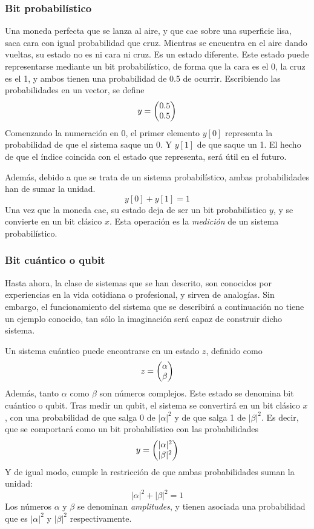 \subsubsection{Bit probabilístico}

Una moneda perfecta que se lanza al aire, y que cae sobre una superficie lisa, 
saca cara con igual probabilidad que cruz. Mientras se encuentra en el aire 
dando vueltas, su estado no es ni cara ni cruz. Es un estado diferente. Este 
estado puede representarse mediante un bit probabilístico, de forma que la cara 
es el 0, la cruz es el 1, y ambos tienen una probabilidad de 0.5 de ocurrir.  
Escribiendo las probabilidades en un vector, se define
%
$$ y = \begin{pmatrix} 0.5 \\ 0.5 \end{pmatrix} $$
%
Comenzando la numeración en 0, el primer elemento $y[0]$ representa la 
probabilidad de que el sistema saque un 0. Y $y[1]$ de que saque un 1. El hecho 
de que el índice coincida con el estado que representa, será útil en el futuro.

Además, debido a que se trata de un sistema probabilístico, ambas probabilidades 
han de sumar la unidad.
%
$$ y[0] + y[1] = 1 $$
%
Una vez que la moneda cae, su estado deja de ser un bit probabilístico $y$, y se 
convierte en un bit clásico $x$. Esta operación es la \textit{medición} de un 
sistema probabilístico.

\subsubsection{Bit cuántico o qubit}

Hasta ahora, la clase de sistemas que se han descrito, son conocidos por 
experiencias en la vida cotidiana o profesional, y sirven de analogías. Sin 
embargo, el funcionamiento del sistema que se describirá a continuación no tiene 
un ejemplo conocido, tan sólo la imaginación será capaz de construir dicho 
sistema.

Un sistema cuántico puede encontrarse en un estado $z$, definido como
%
$$ z = \begin{pmatrix} \alpha \\ \beta \end{pmatrix}$$
%
Además, tanto $\alpha$ como $\beta$ son números complejos. Este estado se 
denomina bit cuántico o qubit.
%
Tras medir un qubit, el sistema se convertirá en un bit clásico $x$, con una 
probabilidad de que salga 0 de $|\alpha|^2$ y de que salga 1 de $|\beta|^2$.
Es decir, que se comportará como un bit probabilístico con las probabilidades
%
$$ y = \begin{pmatrix} |\alpha|^2 \\ |\beta|^2 \end{pmatrix}$$
%
Y de igual modo, cumple la restricción de que ambas probabilidades suman la 
unidad:
%
$$ |\alpha|^2 + |\beta|^2 = 1 $$
%
Los números $\alpha$ y $\beta$ se denominan \textit{amplitudes}, y tienen 
asociada una probabilidad que es $|\alpha|^2$ y $|\beta|^2$ respectivamente.

